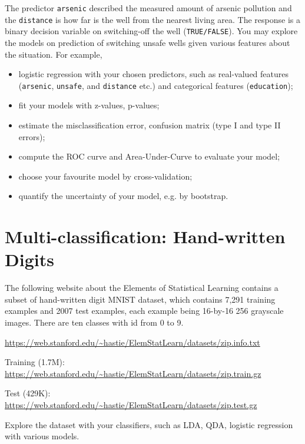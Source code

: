 \documentclass[11pt]{article}
\begin{document}
The predictor {\tt arsenic} described the measured amount of arsenic pollution and the {\tt distance} is how far is the well from the nearest living area. The response is a binary decision variable on switching-off the well ({\tt TRUE/FALSE}). You may explore the models on prediction of switching unsafe wells given various features about the situation. For example, 
\begin{itemize}
\item logistic regression with your chosen predictors, such as real-valued features ({\tt arsenic}, {\tt unsafe}, and {\tt distance} etc.) and categorical features ({\tt education});
\item fit your models with z-values, p-values;
\item estimate the misclassification error, confusion matrix (type I and type II errors);
\item compute the ROC curve and Area-Under-Curve to evaluate your model;
\item choose your favourite model by cross-validation;
\item quantify the uncertainty of your model, e.g. by bootstrap.
\end{itemize}

%
%

\section{Multi-classification: Hand-written Digits}
The following website about the Elements of Statistical Learning contains a subset of hand-written digit MNIST dataset, which contains 7,291 training examples and 2007 test examples, each example being 16-by-16 256 grayscale images. There are ten classes with id from 0 to 9. 

\url{https://web.stanford.edu/~hastie/ElemStatLearn/datasets/zip.info.txt}

Training (1.7M): \url{https://web.stanford.edu/~hastie/ElemStatLearn/datasets/zip.train.gz}

Test (429K): \url{https://web.stanford.edu/~hastie/ElemStatLearn/datasets/zip.test.gz}

Explore the dataset with your classifiers, such as LDA, QDA, logistic regression with various models. 
\end{document}
